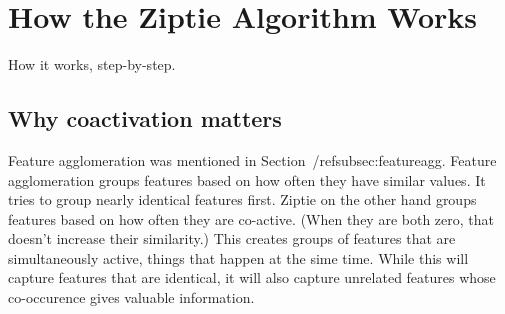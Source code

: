 \section{How the Ziptie Algorithm Works}
\label{sec:algorithm}

How it works, step-by-step.

\subsection{Why coactivation matters}
\label{subsec:whycoactivation}

Feature agglomeration was mentioned in Section~/ref{subsec:featureagg}.
Feature agglomeration groups features based on how often
they have similar values. It tries to group nearly identical
features first. Ziptie on the other hand groups features based on how
often they are co-active. (When they are both zero, that doesn't
increase their similarity.) This creates groups of features that
are simultaneously active, things that
happen at the sime time. While this will capture features that are identical,
it will also capture unrelated features whose co-occurence gives
valuable information.
